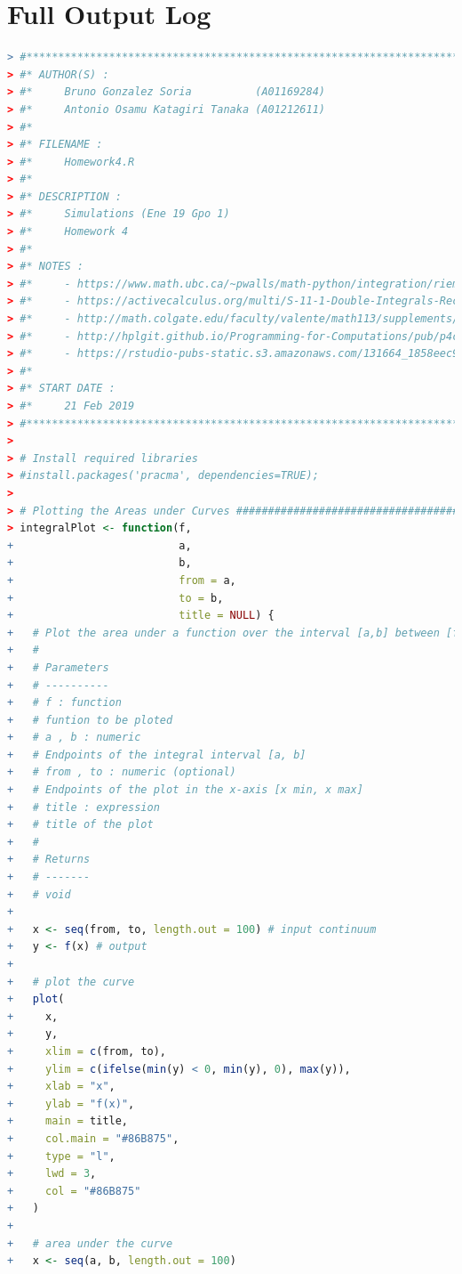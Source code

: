 \documentclass[11pt,a4paper]{article}
\begin{document}
\clearpage

\section{Full Output Log}\label{sec:fullLog}

\begin{lstlisting}[frame=trBL, language=R]
> #********************************************************************
> #* AUTHOR(S) :
> #*     Bruno Gonzalez Soria          (A01169284)
> #*     Antonio Osamu Katagiri Tanaka (A01212611)
> #*
> #* FILENAME :
> #*     Homework4.R
> #*
> #* DESCRIPTION :
> #*     Simulations (Ene 19 Gpo 1)
> #*     Homework 4
> #*
> #* NOTES :
> #*     - https://www.math.ubc.ca/~pwalls/math-python/integration/riemann-sums/
> #*     - https://activecalculus.org/multi/S-11-1-Double-Integrals-Rectangles.html
> #*     - http://math.colgate.edu/faculty/valente/math113/supplements/section151handout.pdf
> #*     - http://hplgit.github.io/Programming-for-Computations/pub/p4c/p4c-sphinx-Python/._pylight004.html
> #*     - https://rstudio-pubs-static.s3.amazonaws.com/131664_1858eec97df54c9b8d5edcd8b22e5818.html
> #*
> #* START DATE :
> #*     21 Feb 2019
> #********************************************************************
> 
> # Install required libraries
> #install.packages('pracma', dependencies=TRUE);
> 
> # Plotting the Areas under Curves ###################################
> integralPlot <- function(f,
+                          a,
+                          b,
+                          from = a,
+                          to = b,
+                          title = NULL) {
+   # Plot the area under a function over the interval [a,b] between [from,to].
+   #
+   # Parameters
+   # ----------
+   # f : function
+   # funtion to be ploted
+   # a , b : numeric
+   # Endpoints of the integral interval [a, b]
+   # from , to : numeric (optional)
+   # Endpoints of the plot in the x-axis [x min, x max]
+   # title : expression
+   # title of the plot
+   #
+   # Returns
+   # -------
+   # void
+   
+   x <- seq(from, to, length.out = 100) # input continuum
+   y <- f(x) # output
+   
+   # plot the curve
+   plot(
+     x,
+     y,
+     xlim = c(from, to),
+     ylim = c(ifelse(min(y) < 0, min(y), 0), max(y)),
+     xlab = "x",
+     ylab = "f(x)",
+     main = title,
+     col.main = "#86B875",
+     type = "l",
+     lwd = 3,
+     col = "#86B875"
+   )
+   
+   # area under the curve
+   x <- seq(a, b, length.out = 100)

\end{lstlisting}
\end{document}
